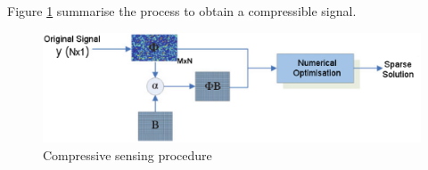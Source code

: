 Figure \ref{fig:compressive} summarise the process to obtain a compressible signal.
\begin{figure}[!h]
\centering
\includegraphics[width=\textwidth]{images/sparse.eps}
\caption[Compressive sensing procedure]{Compressive sensing procedure \cite{compressive}}
\label{fig:compressive}
\end{figure}










